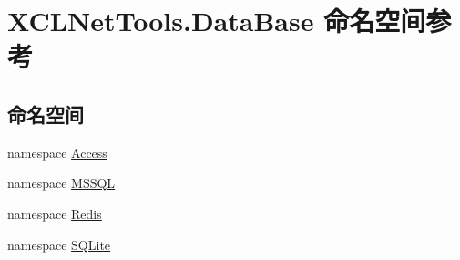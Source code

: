 \hypertarget{namespace_x_c_l_net_tools_1_1_data_base}{}\section{X\+C\+L\+Net\+Tools.\+Data\+Base 命名空间参考}
\label{namespace_x_c_l_net_tools_1_1_data_base}
\subsection*{命名空间}
\begin{DoxyCompactItemize}
\item 
namespace \hyperlink{namespace_x_c_l_net_tools_1_1_data_base_1_1_access}{Access}
\item 
namespace \hyperlink{namespace_x_c_l_net_tools_1_1_data_base_1_1_m_s_s_q_l}{M\+S\+S\+QL}
\item 
namespace \hyperlink{namespace_x_c_l_net_tools_1_1_data_base_1_1_redis}{Redis}
\item 
namespace \hyperlink{namespace_x_c_l_net_tools_1_1_data_base_1_1_s_q_lite}{S\+Q\+Lite}
\end{DoxyCompactItemize}
